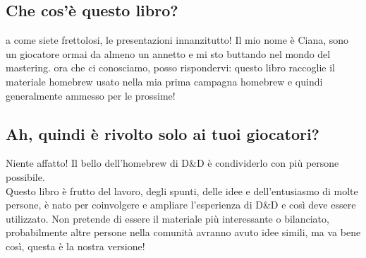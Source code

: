 
\subsection{Che cos'è questo libro?}

a come siete frettolosi, le presentazioni innanzitutto! Il mio nome è Ciana, sono un giocatore ormai da almeno un annetto e mi sto buttando nel mondo del mastering. ora che ci conosciamo, posso rispondervi: questo libro raccoglie il materiale homebrew usato nella mia prima campagna homebrew e quindi generalmente ammesso per le prossime!

\subsection{Ah, quindi è rivolto solo ai tuoi giocatori?}

Niente affatto! Il bello dell'homebrew di D\&D è condividerlo con più persone possibile. \\ Questo libro è frutto del lavoro, degli spunti, delle idee e dell'entusiasmo di molte persone, è nato per coinvolgere e ampliare l'esperienza di D\&D e così deve essere utilizzato. Non pretende di essere il materiale più interessante o bilanciato, probabilmente altre persone nella comunità avranno avuto idee simili, ma va bene così, questa è la nostra versione!
